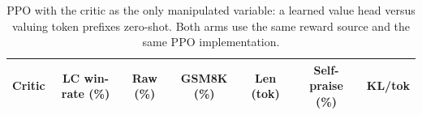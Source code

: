 \begin{table}[t]\centering\small
\caption{PPO with the critic as the only manipulated variable: a learned value head versus \jev{} valuing token prefixes zero-shot. Both arms use the same reward source and the same PPO implementation.}
\label{tab:ppo}
\begin{tabular}{lcccccc}
\toprule
Critic & LC win-rate (\%) & Raw (\%) & GSM8K (\%) & Len (tok) & Self-praise (\%) & KL/tok \\
\midrule

\bottomrule
\end{tabular}
\end{table}
